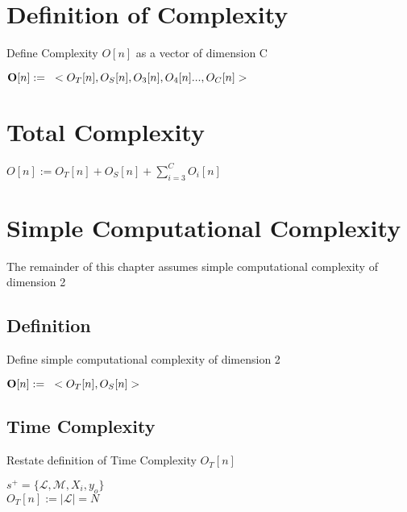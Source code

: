 \documentclass[11pt]{article}
\begin{document}
\section{Definition of Complexity}
Define Complexity $O[n]$ as a vector of dimension C
\begin{center}
$
\bold{O}[n] := \hspace{3mm} < O_T [n], O_S [n],O_3[n],O_4[n]...,O_C[n]>
$
\end{center}

\section{Total Complexity}
\begin{center}
$O[n] := O_T[n] + O_S[n] + \sum_{i=3}^{C} O_i[n]$
\end{center}
























\newpage
\section{Simple Computational Complexity}
The remainder of this chapter assumes simple computational complexity of dimension 2

\subsection{Definition}
Define simple computational complexity of dimension 2
\begin{center}
$
\bold{O}[n] := \hspace{3mm} < O_T [n], O_S [n] >
$
\end{center}





\subsection{Time Complexity}
Restate definition of Time Complexity $O_T[n]$
\begin{center}
$
s^+ = \{ \mathcal{L},\mathcal{M},X_i,y_o\}
$
\\ \vspace{3mm}
$
O_T[n] := |\mathcal{L}| = N
$
\end{center}
\end{document}

